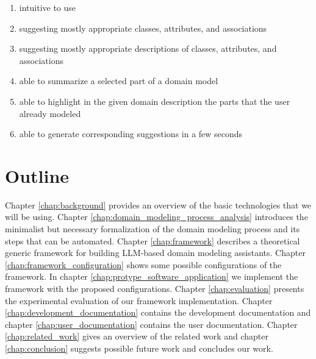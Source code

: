 \begin{enumerate}
\item intuitive to use
\item suggesting mostly appropriate classes, attributes, and associations
\item suggesting mostly appropriate descriptions of classes, attributes, and associations
\item able to summarize a selected part of a domain model
\item able to highlight in the given domain description the parts that the user already modeled
\item able to generate corresponding suggestions in a few seconds
\end{enumerate}


\section*{Outline}

Chapter \ref{chap:background} provides an overview of the basic technologies that we will be using.
Chapter \ref{chap:domain_modeling_process_analysis} introduces the minimalist but necessary formalization of the domain modeling process and its steps that can be automated.
Chapter \ref{chap:framework} describes a theoretical generic framework for building LLM-based domain modeling assistants.
Chapter \ref{chap:framework_configuration} shows some possible configurations of the framework.
In chapter \ref{chap:protype_software_application} we implement the framework with the proposed configurations.
Chapter \ref{chap:evaluation} presents the experimental evaluation of our framework implementation.
Chapter \ref{chap:development_documentation} contains the development documentation and chapter \ref{chap:user_documentation} contains the user documentation. Chapter \ref{chap:related_work} gives an overview of the related work and chapter \ref{chap:conclusion} suggests possible future work and concludes our work.